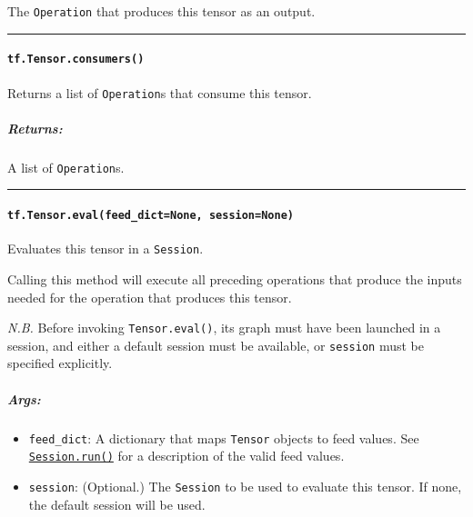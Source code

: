 The \lstinline{Operation} that produces this tensor as an output.

\begin{center}\rule{0.5\linewidth}{\linethickness}\end{center}

\paragraph{\texorpdfstring{\lstinline{tf.Tensor.consumers()}
}{tf.Tensor.consumers() }}\label{tf.tensor.consumers}

Returns a list of \lstinline{Operation}s that consume this tensor.

\subparagraph{Returns: }\label{returns-19}

A list of \lstinline{Operation}s.

\begin{center}\rule{0.5\linewidth}{\linethickness}\end{center}

\paragraph{\texorpdfstring{\lstinline{tf.Tensor.eval(feed_dict=None, session=None)}
}{tf.Tensor.eval(feed_dict=None, session=None) }}\label{tf.tensor.eval}

Evaluates this tensor in a \lstinline{Session}.

Calling this method will execute all preceding operations that produce
the inputs needed for the operation that produces this tensor.

\emph{N.B.} Before invoking \lstinline{Tensor.eval()}, its graph must have
been launched in a session, and either a default session must be
available, or \lstinline{session} must be specified explicitly.

\subparagraph{Args: }\label{args-15}

\begin{itemize}
\tightlist
\item
  \lstinline{feed_dict}: A dictionary that maps \lstinline{Tensor} objects to
  feed values. See
  \href{../../api_docs/python/client.md\#Session.run}{\lstinline{Session.run()}}
  for a description of the valid feed values.
\item
  \lstinline{session}: (Optional.) The \lstinline{Session} to be used to
  evaluate this tensor. If none, the default session will be used.
\end{itemize}

